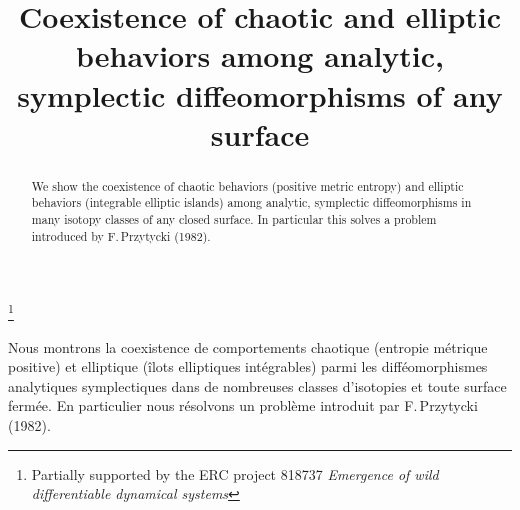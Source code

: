 \documentclass[JEP,XML,SOM,Unicode,NoFloatCountersInSection,Unicode,published]{cedram}
\theoremstyle{definition}
\begin{document}
\frontmatter

\title[Coexistence of chaotic and elliptic behaviors among analytic symplectomorphisms]{Coexistence of chaotic and elliptic behaviors among analytic, symplectic diffeomorphisms of any surface}

\author[\initial{P.} \lastname{Berger}]{ }
\address{Institut de Mathématiques de Jussieu-Paris Rive Gauche, CNRS, Sorbonne Université, Universit\'e de Paris\\
4 place Jussieu, 75252 Paris Cedex 05, France}

\thanks{Partially supported by the ERC project 818737 \emph{Emergence of wild differentiable dynamical systems}}

\begin{abstract}
We show the coexistence of chaotic behaviors (positive metric entropy) and elliptic behaviors (integrable elliptic islands) among analytic, symplectic diffeomorphisms in many isotopy classes of any closed surface. In particular this solves a problem introduced by F.\,Przytycki (1982).
\end{abstract}





\begin{altabstract}
Nous montrons la coexistence de comportements chaotique (entropie m\'etrique positive) et elliptique (\^ilots elliptiques int\'egrables) parmi les diff\'eomorphismes analytiques symplectiques dans de nombreuses classes d'isotopies et toute surface ferm\'ee. En particulier nous r\'esolvons un probl\`eme introduit par F.\,Przytycki (1982).
\end{altabstract}
\maketitle
\vspace*{-.5\baselineskip}
\tableofcontents
\mainmatter
\end{document}
